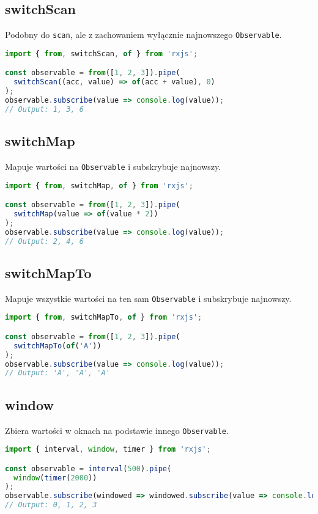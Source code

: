 \documentclass[a4paper,12pt]{article}
\begin{document}
\subsection{switchScan}
Podobny do \texttt{scan}, ale z zachowaniem wyłącznie najnowszego \texttt{Observable}.

\begin{lstlisting}[language=JavaScript, caption=Przykład użycia \texttt{switchScan}]
import { from, switchScan, of } from 'rxjs';

const observable = from([1, 2, 3]).pipe(
  switchScan((acc, value) => of(acc + value), 0)
);
observable.subscribe(value => console.log(value));
// Output: 1, 3, 6
\end{lstlisting}

\subsection{switchMap}
Mapuje wartości na \texttt{Observable} i subskrybuje najnowszy.

\begin{lstlisting}[language=JavaScript, caption=Przykład użycia \texttt{switchMap}]
import { from, switchMap, of } from 'rxjs';

const observable = from([1, 2, 3]).pipe(
  switchMap(value => of(value * 2))
);
observable.subscribe(value => console.log(value));
// Output: 2, 4, 6
\end{lstlisting}

\subsection{switchMapTo}
Mapuje wszystkie wartości na ten sam \texttt{Observable} i subskrybuje najnowszy.

\begin{lstlisting}[language=JavaScript, caption=Przykład użycia \texttt{switchMapTo}]
import { from, switchMapTo, of } from 'rxjs';

const observable = from([1, 2, 3]).pipe(
  switchMapTo(of('A'))
);
observable.subscribe(value => console.log(value));
// Output: 'A', 'A', 'A'
\end{lstlisting}

\subsection{window}
Zbiera wartości w oknach na podstawie innego \texttt{Observable}.

\begin{lstlisting}[language=JavaScript, caption=Przykład użycia \texttt{window}]
import { interval, window, timer } from 'rxjs';

const observable = interval(500).pipe(
  window(timer(2000))
);
observable.subscribe(windowed => windowed.subscribe(value => console.log(value)));
// Output: 0, 1, 2, 3
\end{lstlisting}
\end{document}
